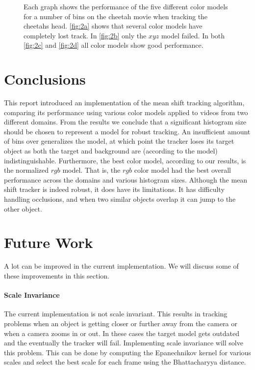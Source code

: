 \documentclass[11pt]{article}
\begin{document}
\begin{figure}[!ht]
{\label{fig:2d}
}
\caption{Each graph shows the performance of the five different color models for
a number of bins on the cheetah movie when tracking the cheetahs head.
\ref{fig:2a} shows that several color models have completely lost track. In
\ref{fig:2b} only the $xyz$ model failed. In both \ref{fig:2c} and \ref{fig:2d}
all color models show good performance.}
\label{fig:cheetah}
\end{figure}

\section{Conclusions} \label{sec:conclusion}
This report introduced an implementation of the mean shift tracking algorithm,
comparing its performance using various color models applied to videos from two
different domains.  From the results we conclude that a significant histogram
size should be chosen to represent a model for robust tracking. An insufficient
amount of bins over generalizes the model, at which point the tracker loses its
target object as both the target and background are (according to the model)
indistinguishable.  Furthermore, the best color model, according to our
results, is the normalized $rgb$ model. That is, the $rgb$ color model had the
best overall performance across the domains and various histogram sizes.
Although the mean shift tracker is indeed robust, it does have its limitations.
It has difficulty handling occlusions, and when two similar objects overlap it
can jump to the other object.

\section{Future Work} \label{sec:future}
A lot can be improved in the current implementation. We will discuss some of
these improvements in this section.

\paragraph{Scale Invariance} The current implementation is not scale invariant. This
results in tracking problems when an object is getting closer or further away
from the camera or when a camera zooms in or out. In these cases the target
model gets outdated and the eventually the tracker will fail. Implementing
scale invariance will solve this problem. This can be done by computing the
Epanechnikov kernel for various scales and select the best scale for each
frame using the Bhattacharyya distance.
\end{document}
